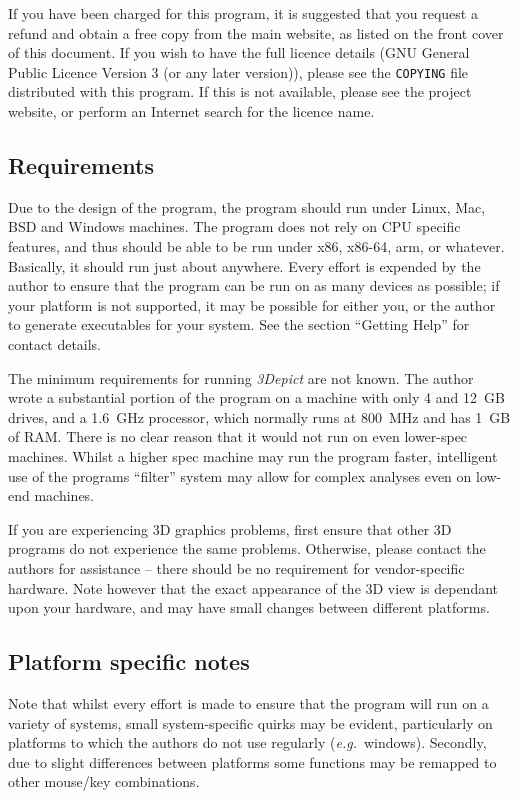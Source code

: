 \documentclass[10pt]{article}
\begin{document}
If you have been charged for this program, it is suggested that you request a refund and obtain a free copy from the main website, as listed on the front cover of this document. If you wish to have the full licence details (GNU General Public Licence Version 3 (or any later version)), please see the \texttt{COPYING} file distributed with this program. If this is not available, please see the project website, or perform an Internet search for the licence name.
 
\subsection{Requirements}
Due to the design of the program, the program should run under Linux, Mac, BSD and Windows machines. The program does not rely on CPU specific features, and thus should be able to be run under x86, x86-64, arm, or whatever. Basically, it should run just about anywhere. Every effort is expended by the author to ensure that the program can be run on as many devices as possible; if your platform is not supported, it may be possible for either you, or the author to generate executables for your system. See the section ``Getting Help'' for contact details.  

The minimum requirements for running \emph{3Depict} are not known. The author wrote a substantial portion of the program on a machine with only 4 and 12~GB drives, and a 1.6~GHz processor, which normally runs at 800~MHz and has 1~GB of RAM. There is no clear reason that it would not run on even lower-spec machines. Whilst a higher spec machine may run the program faster, intelligent use of the programs ``filter'' system may allow for complex analyses even on low-end machines. 

If you are experiencing 3D graphics problems, first ensure that other 3D programs do not experience the same problems. Otherwise, please contact the authors for assistance -- there should be no requirement for vendor-specific hardware. Note however that the exact appearance of the 3D view is dependant upon your hardware, and may have small changes between different platforms. 

\subsection{Platform specific notes}
Note that whilst every effort is made to ensure that the program will run on a variety of systems, small system-specific quirks may be evident, particularly on platforms to which the authors do not use regularly (\emph{e.g.}\ windows). Secondly, due to slight differences between platforms some functions may be remapped to other mouse/key combinations.  
\end{document}
